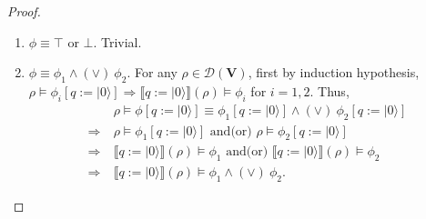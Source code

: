 \documentclass[conference,compsoc, 10pt]{IEEEtran}
\newcommand {\qI} {{q:=|0\rangle}}
\newcommand {\cD } {{\mathcal{D}}}
\newcommand {\vars } {\mathbf{V}}
\newcommand {\sem}[1] {\llbracket#1\rrbracket}
\begin{document}
\begin{appendices}
\begin{proof}
\begin{enumerate}
				
				\item $\phi \equiv \top$ or $\bot$. Trivial.
				
				\item $\phi \equiv \phi_1\wedge\!(\vee)\ \phi_2$. For any $\rho\in\cD(\vars)$, first by induction hypothesis, $\rho\models\phi_i[\qI]\Rightarrow\sem{\qI}(\rho)\models\phi_i$ for $i = 1,2$. Thus, 
				\begin{align*}
				&\rho\models\phi[\qI] \equiv \phi_1[\qI]\wedge\!(\vee)\ \phi_2[\qI] \\
				\Longrightarrow\ &\rho\models\phi_1[\qI] \text{\ and(or)\ }\rho\models\phi_2[\qI] \\
				\Longrightarrow\ &\sem{\qI}(\rho)\models\phi_1 \text{\ and(or)\ }\sem{\qI}(\rho)\models\phi_2 \\
				\Longrightarrow\ &\sem{\qI}(\rho)\models\phi_1\wedge\!(\vee)\ \phi_2.
				\end{align*}
				

\end{enumerate}
\end{proof}
\end{appendices}
\end{document}
